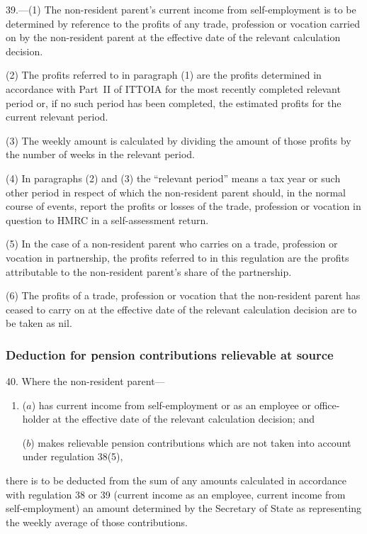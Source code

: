 \documentclass[12pt,a4paper]{article}
\begin{document}
39.---(1)  The non-resident parent’s current income from self-employment is to be determined by reference to the profits of any trade, profession or vocation carried on by the non-resident parent at the effective date of the relevant calculation decision.

(2) The profits referred to in paragraph (1) are the profits determined in accordance with Part~II of ITTOIA for the most recently completed relevant period or, if no such period has been completed, the estimated profits for the current relevant period.

(3) The weekly amount is calculated by dividing the amount of those profits by the number of weeks in the relevant period.

(4) In paragraphs (2) and (3) the “relevant period” means a tax year or such other period in respect of which the non-resident parent should, in the normal course of events, report the profits or losses of the trade, profession or vocation in question to HMRC in a self-assessment return.

(5) In the case of a non-resident parent who carries on a trade, profession or vocation in partnership, the profits referred to in this regulation are the profits attributable to the non-resident parent’s share of the partnership.

(6) The profits of a trade, profession or vocation that the non-resident parent has ceased to carry on at the effective date of the relevant calculation decision are to be taken as nil.

\subsubsection[40. Deduction for pension contributions relievable at source]{Deduction for pension contributions relievable at source}

40.  Where the non-resident parent—
\begin{enumerate}\item[]
($a$) has current income from self-employment or as an employee or office-holder at the effective date of the relevant calculation decision; and

($b$) makes relievable pension contributions which are not taken into account under regulation 38(5),
\end{enumerate}
there is to be deducted from the sum of any amounts calculated in accordance with regulation 38 or 39 (current income as an employee, current income from self-employment) an amount determined by the Secretary of State as representing the weekly average of those contributions.
\end{document}
